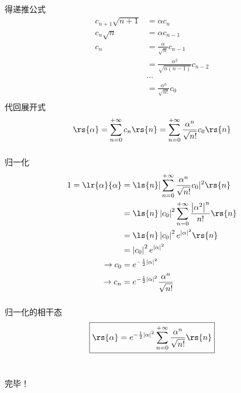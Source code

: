 \begin{frame}
    \frametitle{}
    得递推公式
    \[\begin{aligned}
      c_{n+1} \sqrt{n+1} &=\alpha c_n \\
      c_{n} \sqrt{n} &=\alpha c_{n-1} \\
      c_{n}  &=\frac{\alpha}{\sqrt{n}} c_{n-1} \\
              &=\frac{\alpha^2}{\sqrt{n(n-1)}} c_{n-2} \\
              & \cdots  \\ 
              &=\frac{\alpha^n}{\sqrt{n!}} c_{0} \\
  \end{aligned} \]
  代回展开式
  \[ \rs{\alpha} = \sum_{n=0} ^{+\infty} c_n  \rs{n} = \sum_{n=0} ^{+\infty} \frac{\alpha^n}{\sqrt{n!}} c_{0} \rs{n} \]
\end{frame}

\begin{frame}
    \frametitle{}
    归一化
    \[ \begin{aligned}
      1=\lr{\alpha}{\alpha} &=\ls{n}|\sum_{n=0} ^{+\infty} \frac{\alpha^n}{\sqrt{n!}} c_{0}|^2 \rs{n} \\ 
      &= \ls{n}\left|c_0\right|^2 \sum_{n=0} ^{+\infty} \frac{\left|\alpha^2\right|^n}{n!}  \rs{n} \\ 
      &= \ls{n}\left|c_0\right|^2 e^{\left|\alpha\right|^2}  \rs{n} \\  
      &= \left|c_0\right|^2 e^{\left|\alpha\right|^2}  \\ 
      \to c_0 &=   e^{-\frac{1}{2}\left|\alpha\right|^2} \\
      \to c_n &=  e^{-\frac{1}{2}\left|\alpha\right|^2} \frac{\alpha^n}{\sqrt{n!}}  
  \end{aligned}\]
  \end{frame}
  
  \begin{frame} 
  \frametitle{}
       
  归一化的相干态
  \[ \boxed{\rs{\alpha} = e^{-\frac{1}{2}\left|\alpha\right|^2}  \sum_{n=0} ^{+\infty}  \frac{\alpha^n}{\sqrt{n!}} \rs{n}}\]
 ~\\ {\vspace*{2.3em}}

 完毕！

\end{frame}

